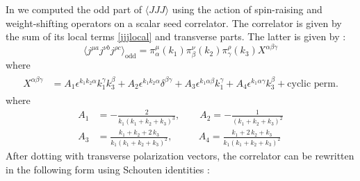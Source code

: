\documentclass[a4paper,11pt]{article}
\begin{document}
In \cite{Jain:2021wyn} we computed the odd part of $\langle JJJ\rangle$ using the action of spin-raising and weight-shifting operators on a scalar seed correlator. 
The correlator is given by the sum of its local terms \eqref{jjjlocal} and transverse parts. The latter is given by :
\begin{equation}
 \langle j^{\mu a} j^{\nu b} j^{\rho c} \rangle_{\text{odd}}=\pi^{\mu}_{\alpha}(k_1)\pi^{\nu}_{\beta}(k_2)\pi^{\rho}_{\gamma}(k_3)X^{\alpha\beta\gamma}
\end{equation}
where
\begin{align}\label{jjjansatz}
\begin{split}
X^{\alpha\beta\gamma}&=A_1\epsilon^{k_1 k_2 \alpha}k_1^{\gamma}k_3^{\beta}+A_2\epsilon^{k_1 k_2 \alpha}\delta^{\beta\gamma}+A_3\epsilon^{k_1 \alpha \beta}k_1^{\gamma}+A_4\epsilon^{k_1 \alpha \gamma}k_3^{\beta}+\text{cyclic perm.}
\end{split}
\end{align}
where
\begin{align}
A_1&=-\frac{2}{k_1(k_1+k_2+k_3)^3},\quad\quad
A_2=-\frac{1}{(k_1+k_2+k_3)^2}\nonumber\\[5 pt]
A_3&=\frac{k_1+k_2+2\,k_3}{k_1(k_1+k_2+k_3)^2},\quad\quad\,\,\,\,
A_4=\frac{k_1+2\,k_2+k_3}{k_1(k_1+k_2+k_3)^2}
\end{align}
After dotting with transverse polarization vectors, the correlator can be rewritten in the following form using Schouten identities :
\end{document}
